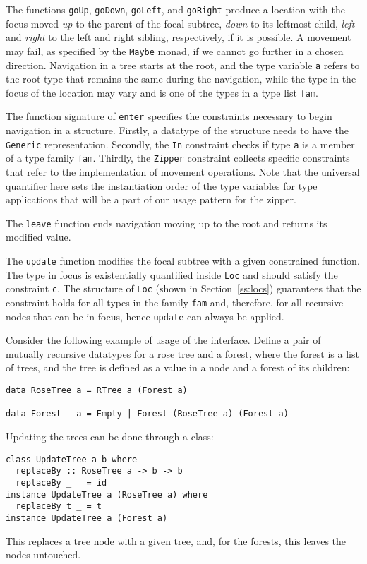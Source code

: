 \documentclass[runningheads]{llncs}
\newcommand{\K}[1]{\lstinline{#1}}
\begin{document}
The functions \K{goUp}, \K{goDown}, \K{goLeft}, and \K{goRight} produce a location with the focus moved \emph{up} to the parent of the focal subtree, \emph{down} to its leftmost child, \emph{left} and \emph{right} to the left and right sibling, respectively, if it is possible. A movement may fail, as specified by the \K{Maybe} monad, if we cannot go further in a chosen direction. Navigation in a tree starts at the root, and the type variable \K{a} refers to the root type that remains the same during the navigation, while the type in the focus of the location may vary and is one of the types in a type list \K{fam}.

The function signature of \K{enter} specifies the constraints necessary to begin navigation in a structure. Firstly, a datatype of the structure needs to have the \K{Generic} representation. Secondly, the \K{In} constraint checks if type \K{a} is a member of a type family \K{fam}. Thirdly, the \K{Zipper} constraint collects specific constraints that refer to the implementation of movement operations. Note that the universal quantifier here sets the instantiation order of the type variables for type applications that will be a part of our usage pattern for the zipper. 

The \K{leave} function ends navigation moving up to the root and returns its modified value. 

The \K{update} function modifies the focal subtree with a given constrained function. The type in focus is existentially quantified inside \K{Loc} and should satisfy the constraint \K{c}. The structure of \K{Loc} (shown in Section~\ref{ss:locs}) guarantees that the constraint holds for all types in the family \K{fam} and, therefore, for all recursive nodes that can be in focus, hence \K{update} can always be applied.

Consider the following example of usage of the interface. Define a pair of mutually recursive datatypes for a rose tree and a forest, where the forest is a list of trees, and the tree is defined as a value in a node and a forest of its children:
\begin{lstlisting}
data RoseTree a = RTree a (Forest a)

data Forest   a = Empty | Forest (RoseTree a) (Forest a)
\end{lstlisting}

Updating the trees can be done through a class:
\begin{lstlisting}
class UpdateTree a b where
  replaceBy :: RoseTree a -> b -> b
  replaceBy _   = id
instance UpdateTree a (RoseTree a) where
  replaceBy t _ = t
instance UpdateTree a (Forest a)
\end{lstlisting}
This replaces a tree node with a given tree, and, for the forests, this leaves the nodes untouched.
\end{document}
